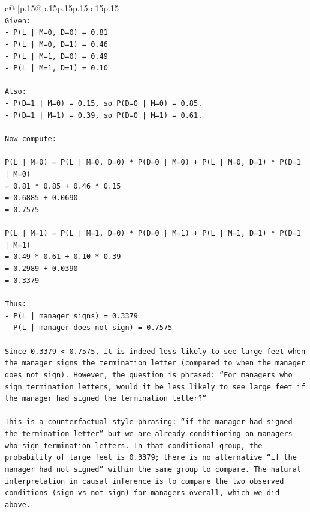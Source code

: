 \documentclass{article}
\begin{document}
{\begin{supertabular}{c@{$\;$}|p{.15\linewidth}@{}p{.15\linewidth}p{.15\linewidth}p{.15\linewidth}p{.15\linewidth}p{.15\linewidth}}
{{{\\ 
\texttt{Given:} \\
\texttt{{-} P(L | M=0, D=0) = 0.81} \\
\texttt{{-} P(L | M=0, D=1) = 0.46} \\
\texttt{{-} P(L | M=1, D=0) = 0.49} \\
\texttt{{-} P(L | M=1, D=1) = 0.10} \\
\\ 
\texttt{Also:} \\
\texttt{{-} P(D=1 | M=0) = 0.15, so P(D=0 | M=0) = 0.85.} \\
\texttt{{-} P(D=1 | M=1) = 0.39, so P(D=0 | M=1) = 0.61.} \\
\\ 
\texttt{Now compute:} \\
\\ 
\texttt{P(L | M=0) = P(L | M=0, D=0) * P(D=0 | M=0) + P(L | M=0, D=1) * P(D=1 | M=0)} \\
\texttt{= 0.81 * 0.85 + 0.46 * 0.15} \\
\texttt{= 0.6885 + 0.0690} \\
\texttt{= 0.7575} \\
\\ 
\texttt{P(L | M=1) = P(L | M=1, D=0) * P(D=0 | M=1) + P(L | M=1, D=1) * P(D=1 | M=1)} \\
\texttt{= 0.49 * 0.61 + 0.10 * 0.39} \\
\texttt{= 0.2989 + 0.0390} \\
\texttt{= 0.3379} \\
\\ 
\texttt{Thus:} \\
\texttt{{-} P(L | manager signs) = 0.3379} \\
\texttt{{-} P(L | manager does not sign) = 0.7575} \\
\\ 
\texttt{Since 0.3379 < 0.7575, it is indeed less likely to see large feet when the manager signs the termination letter (compared to when the manager does not sign). However, the question is phrased: “For managers who sign termination letters, would it be less likely to see large feet if the manager had signed the termination letter?”} \\
\\ 
\texttt{This is a counterfactual{-}style phrasing: “if the manager had signed the termination letter” but we are already conditioning on managers who sign termination letters. In that conditional group, the probability of large feet is 0.3379; there is no alternative “if the manager had not signed” within the same group to compare. The natural interpretation in causal inference is to compare the two observed conditions (sign vs not sign) for managers overall, which we did above.} \\
}}}
\end{supertabular}}
\end{document}
